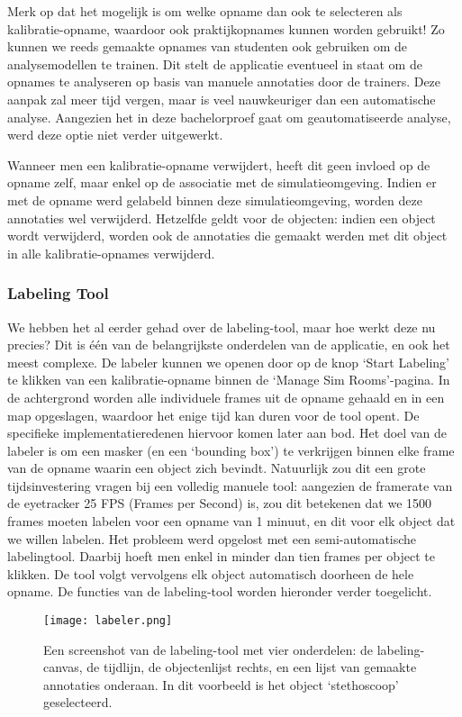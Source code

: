 Merk op dat het mogelijk is om welke opname dan ook te selecteren als kalibratie-opname, waardoor ook praktijkopnames kunnen worden gebruikt!
Zo kunnen we reeds gemaakte opnames van studenten ook gebruiken om de analysemodellen te trainen.
Dit stelt de applicatie eventueel in staat om de opnames te analyseren op basis van manuele annotaties door de trainers.
Deze aanpak zal meer tijd vergen, maar is veel nauwkeuriger dan een automatische analyse. Aangezien het in deze bachelorproef gaat om geautomatiseerde analyse, werd deze optie niet verder uitgewerkt.

Wanneer men een kalibratie-opname verwijdert, heeft dit geen invloed op de opname zelf, maar enkel op de associatie met de simulatieomgeving.
Indien er met de opname werd gelabeld binnen deze simulatieomgeving, worden deze annotaties wel verwijderd. 
Hetzelfde geldt voor de objecten: indien een object wordt verwijderd, worden ook de annotaties die gemaakt werden met dit object in alle kalibratie-opnames verwijderd.

\subsubsection{Labeling Tool}

We hebben het al eerder gehad over de labeling-tool, maar hoe werkt deze nu precies? Dit is één van de belangrijkste onderdelen van de applicatie, en ook het meest complexe.
De labeler kunnen we openen door op de knop `Start Labeling' te klikken van een kalibratie-opname binnen de `Manage Sim Rooms'-pagina.
In de achtergrond worden alle individuele frames uit de opname gehaald en in een map opgeslagen, waardoor het enige tijd kan duren voor de tool opent. De specifieke implementatieredenen hiervoor komen later aan bod.
Het doel van de labeler is om een masker (en een `bounding box') te verkrijgen binnen elke frame van de opname waarin een object zich bevindt.
Natuurlijk zou dit een grote tijdsinvestering vragen bij een volledig manuele tool: aangezien de framerate van de eyetracker 25 FPS (Frames per Second) is, zou dit betekenen dat we 1500 frames moeten labelen voor een opname van 1 minuut, en dit voor elk object dat we willen labelen.
Het probleem werd opgelost met een semi-automatische labelingtool. Daarbij hoeft men enkel in minder dan tien frames per object te klikken. De tool volgt vervolgens elk object automatisch doorheen de hele opname.
De functies van de labeling-tool worden hieronder verder toegelicht.

\begin{figure}[H]
  \centering
  \texttt{[image: labeler.png]}
  \caption[]{\label{fig:labeler} Een screenshot van de labeling-tool met vier onderdelen: de labeling-canvas, de tijdlijn, de objectenlijst rechts, en een lijst van gemaakte annotaties onderaan. In dit voorbeeld is het object `stethoscoop' geselecteerd. }
\end{figure}


